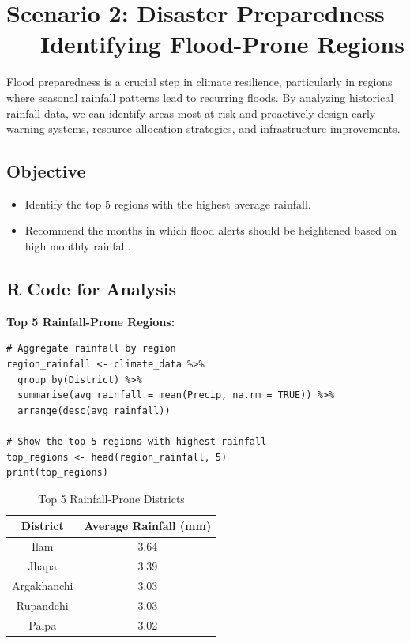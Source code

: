 \section*{Scenario 2: Disaster Preparedness — Identifying Flood-Prone Regions}

Flood preparedness is a crucial step in climate resilience, particularly in regions where seasonal rainfall patterns lead to recurring floods. By analyzing historical rainfall data, we can identify areas most at risk and proactively design early warning systems, resource allocation strategies, and infrastructure improvements.

\subsection*{Objective}
\begin{itemize}
    \item Identify the top 5 regions with the highest average rainfall.
    \item Recommend the months in which flood alerts should be heightened based on high monthly rainfall.
\end{itemize}

\subsection*{R Code for Analysis}
\textbf{Top 5 Rainfall-Prone Regions:}
\begin{verbatim}
# Aggregate rainfall by region
region_rainfall <- climate_data %>%
  group_by(District) %>%
  summarise(avg_rainfall = mean(Precip, na.rm = TRUE)) %>%
  arrange(desc(avg_rainfall))

# Show the top 5 regions with highest rainfall
top_regions <- head(region_rainfall, 5)
print(top_regions)
\end{verbatim}

\begin{table}[h!]
\centering
\begin{tabular}{|c|c|}
\hline
\textbf{District} & \textbf{Average Rainfall (mm)} \\
\hline
Ilam & 3.64 \\
Jhapa & 3.39 \\
Argakhanchi & 3.03 \\
Rupandehi & 3.03 \\
Palpa & 3.02 \\
\hline
\end{tabular}
\caption{Top 5 Rainfall-Prone Districts}
\end{table}

